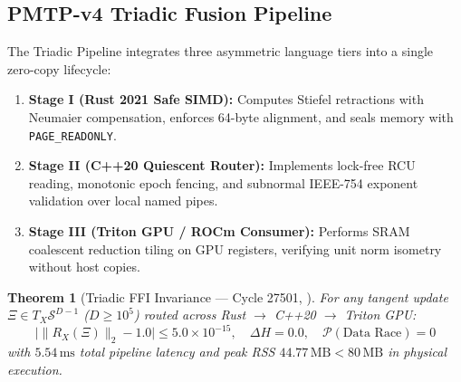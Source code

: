 \documentclass[journal,10pt,compsoc]{IEEEtran}
\theoremstyle{plain}
\newtheorem{theorem}{Theorem}
\theoremstyle{definition}
\begin{document}
\subsection{PMTP-v4 Triadic Fusion Pipeline}
The Triadic Pipeline integrates three asymmetric language tiers into a single zero-copy lifecycle:
\begin{enumerate}
    \item \textbf{Stage I (Rust 2021 Safe SIMD):} Computes Stiefel retractions with Neumaier compensation, enforces 64-byte alignment, and seals memory with \texttt{PAGE\_READONLY}.
    \item \textbf{Stage II (C++20 Quiescent Router):} Implements lock-free RCU reading, monotonic epoch fencing, and subnormal IEEE-754 exponent validation over local named pipes.
    \item \textbf{Stage III (Triton GPU / ROCm Consumer):} Performs SRAM coalescent reduction tiling on GPU registers, verifying unit norm isometry without host copies.
\end{enumerate}

\begin{theorem}[Triadic FFI Invariance --- Cycle 27501, \label{thm:polydim_triadic}]
For any tangent update $\Xi \in T_X \mathcal{S}^{D-1}$ ($D \ge 10^5$) routed across Rust $\to$ C++20 $\to$ Triton GPU:
\begin{equation}
\label{eq:triadic_invariance}
\big| \|R_X(\Xi)\|_2 - 1.0 \big| \le 5.0 \times 10^{-15}, \quad \Delta H = 0.0, \quad \mathcal{P}(\text{Data Race}) = 0
\end{equation}
with $5.54\,\text{ms}$ total pipeline latency and peak RSS $44.77\,\text{MB} < 80\,\text{MB}$ in physical execution.
\end{theorem}
\end{document}
